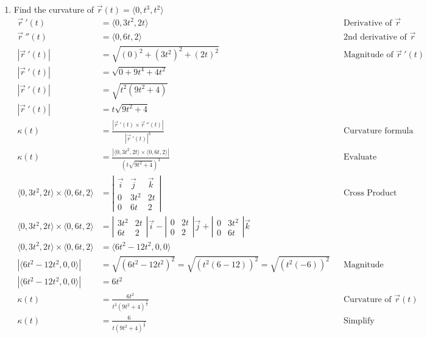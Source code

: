 \documentclass{article}
\newenvironment{problem}[1]{
    \begin{enumerate}
        \item[\bfseries{#1}]
}
{
    \end{enumerate}
}
\begin{document}
\newpage
\begin{problem}{8}
    Find the curvature of $\vec r(t) = \langle 0, t^3, t^2\rangle$
    \begin{align*}
        \vec r\ '(t) &= \langle 0, 3t^2, 2t \rangle && \text{Derivative of $\vec r$}\\
        \vec r\ ''(t) &= \langle 0, 6t, 2 \rangle && \text{2nd derivative of $\vec r$}\\
        |\vec r\ '(t)| &= \sqrt{(0)^2 + (3t^2)^2 + (2t)^2} && \text{Magnitude of $\vec r \ '(t)$}\\
        |\vec r\ '(t)| &= \sqrt{0 + 9t^4 + 4t^2} &&\\
        |\vec r\ '(t)| &= \sqrt{t^2(9t^2 + 4)} &&\\
        |\vec r\ '(t)| &= t\sqrt{9t^2 + 4} &&\\
        \kappa(t) &= \frac{|\vec r\ '(t) \times \vec r \ ''(t)|}{|\vec r \ '(t)|^3} && \text{Curvature formula}\\
        \kappa(t) &= \frac{|\langle 0, 3t^2, 2t \rangle \times \langle 0, 6t, 2 \rangle|}{\left(t\sqrt{9t^2 + 4}\right)^3} && \text{Evaluate curvature}\\
        \langle 0, 3t^2, 2t \rangle \times \langle 0, 6t, 2 \rangle &= \left| {\begin{array}{*{20}{c}}{\vec i}&{\vec j}&{\vec k}\\{0}&{3t^2}&{2t}\\{0}&{6t}&{2}\end{array}} \right| && \text{Cross Product}\\
        \langle 0, 3t^2, 2t \rangle \times \langle 0, 6t, 2 \rangle &= \left| {\begin{array}{*{20}{c}}{3t^2}&{2t}\\{6t}&{2}\end{array}} \right|\vec i - \left| {\begin{array}{*{20}{c}}{0}&{2t}\\{0}&{2}\end{array}} \right|\vec j + \left| {\begin{array}{*{20}{c}}{0}&{3t^2}\\{0}&{6t}\end{array}} \right|\vec k\\
        \langle 0, 3t^2, 2t \rangle \times \langle 0, 6t, 2 \rangle &= \langle 6t^2 - 12t^2, 0, 0 \rangle\\
        \left|\langle 6t^2 - 12t^2, 0, 0 \rangle\right| &= \sqrt{(6t^2 - 12t^2)^2} = \sqrt{\left(t^2(6 - 12)\right)^2} = \sqrt{\left(t^2(-6)\right)^2}&& \text{Magnitude}\\
        \left|\langle 6t^2 - 12t^2, 0, 0 \rangle\right| &= 6t^2\\
        \kappa(t) &= \frac{6t^2}{t^3(9t^2 + 4)^{\frac{3}{2}}}&&\text{Curvature of $\vec r(t)$}\\
        \kappa(t) &= \frac{6}{t(9t^2 + 4)^{\frac{3}{2}}} && \text{Simplify}
    \end{align*}
\end{problem}
\end{document}
